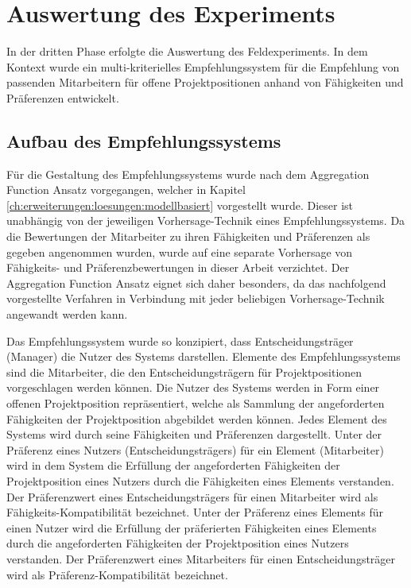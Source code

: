 \section{Auswertung des Experiments}
In der dritten Phase erfolgte die Auswertung des Feldexperiments.
In dem Kontext wurde ein multi-kriterielles Empfehlungssystem für die Empfehlung von passenden Mitarbeitern für offene Projektpositionen anhand von Fähigkeiten und Präferenzen entwickelt.

\subsection{Aufbau des Empfehlungssystems}
Für die Gestaltung des Empfehlungssystems wurde nach dem Aggregation Function Ansatz vorgegangen, welcher in Kapitel \ref{ch:erweiterungen:loesungen:modellbasiert} vorgestellt wurde.
Dieser ist unabhängig von der jeweiligen Vorhersage-Technik eines Empfehlungssystems.
Da die Bewertungen der Mitarbeiter zu ihren Fähigkeiten und Präferenzen als gegeben angenommen wurden, wurde auf eine separate Vorhersage von Fähigkeits- und Präferenzbewertungen in dieser Arbeit verzichtet.
Der Aggregation Function Ansatz eignet sich daher besonders, da das nachfolgend vorgestellte Verfahren in Verbindung mit jeder beliebigen Vorhersage-Technik angewandt werden kann.

Das Empfehlungssystem wurde so konzipiert, dass Entscheidungsträger (Manager) die Nutzer des Systems darstellen.
Elemente des Empfehlungssystems sind die Mitarbeiter, die den Entscheidungsträgern für Projektpositionen vorgeschlagen werden können.
Die Nutzer des Systems werden in Form einer offenen Projektposition repräsentiert, welche als Sammlung der angeforderten Fähigkeiten der Projektposition abgebildet werden können.
Jedes Element des Systems wird durch seine Fähigkeiten und Präferenzen dargestellt.
Unter der Präferenz eines Nutzers (Entscheidungsträgers) für ein Element (Mitarbeiter) wird in dem System die Erfüllung der angeforderten Fähigkeiten der Projektposition eines Nutzers durch die Fähigkeiten eines Elements verstanden.
Der Präferenzwert eines Entscheidungsträgers für einen Mitarbeiter wird als Fähigkeits-Kompatibilität bezeichnet.
Unter der Präferenz eines Elements für einen Nutzer wird die Erfüllung der präferierten Fähigkeiten eines Elements durch die angeforderten Fähigkeiten der Projektposition eines Nutzers verstanden.
Der Präferenzwert eines Mitarbeiters für einen Entscheidungsträger wird als Präferenz-Kompatibilität bezeichnet.

